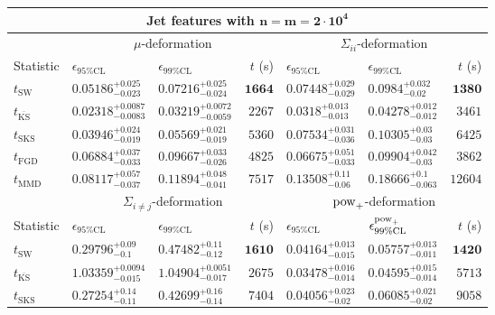 \begin{tabular}{l|llr|llr}
	\toprule
	\multicolumn{7}{c}{{\bf Jet features with $\mathbf{n=m=2\cdot 10^{4}}$}} \\
	\toprule
	\multicolumn{1}{c}{} & \multicolumn{3}{c}{$\mu$-deformation} & \multicolumn{3}{c}{$\Sigma_{ii}$-deformation} \\
	Statistic & $\epsilon_{95\%\mathrm{CL}}$ & $\epsilon_{99\%\mathrm    {CL}}$ & $t$ (s) & $\epsilon_{95\%\mathrm{CL}}$ & $\epsilon_{99\%\mathrm{CL}}$ & $t$ (s) \\
	\midrule
	$t_{\mathrm{SW}}$ & $0.05186_{-0.023}^{+0.025}$ & $0.07216_{-0.024}^{+0.025}$ & ${\mathbf{1664}}$ & $0.07448_{-0.029}^{+0.029}$ & $0.0984_{-0.02}^{+0.032}$ & ${\mathbf{1380}}$ \\
	$t_{\overline{\mathrm{KS}}}$ & ${\mathbf{0.02318_{-0.0083}^{+0.0087}}}$ & ${\mathbf{0.03219_{-0.0059}^{+0.0072}}}$ & $2267$ & ${\mathbf{0.0318_{-0.013}^{+0.013}}}$ & ${\mathbf{0.04278_{-0.012}^{+0.012}}}$ & $3461$ \\
	$t_{\mathrm{SKS}}$ & $0.03946_{-0.019}^{+0.024}$ & $0.05569_{-0.019}^{+0.021}$ & $5360$ & $0.07534_{-0.036}^{+0.031}$ & $0.10305_{-0.03}^{+0.03}$ & $6425$ \\
	$t_{\mathrm{FGD}}$ & $0.06884_{-0.033}^{+0.037}$ & $0.09667_{-0.026}^{+0.033}$ & $4825$ & $0.06675_{-0.033}^{+0.051}$ & $0.09904_{-0.03}^{+0.042}$ & $3862$ \\
	$t_{\mathrm{MMD}}$ & $0.08117_{-0.037}^{+0.057}$ & $0.11894_{-0.041}^{+0.048}$ & $7517$ & $0.13508_{-0.06}^{+0.11}$ & $0.18666_{-0.063}^{+0.1}$ & $12604$ \\
	\toprule
	\multicolumn{1}{c}{} & \multicolumn{3}{c}{$\Sigma_{i\neq j}$-deformation} & \multicolumn{3}{c}{$\rm{pow}_{+}$-deformation} \\
	Statistic & $\epsilon_{95\%\mathrm{CL}}$ & $\epsilon_{99\%\mathrm{CL}}$ & $t$ (s) & $\epsilon_{95\%\mathrm{CL}}$ & $\epsilon^{\rm   {pow}_{+}}_{99\%\mathrm{CL}}$ & $t$ (s) \\
	\midrule
	$t_{\mathrm{SW}}$ & $0.29796_{-0.1}^{+0.09}$ & $0.47482_{-0.12}^{+0.11}$ & ${\mathbf{1610}}$ & $0.04164_{-0.015}^{+0.013}$ & $0.05757_{-0.011}^{+0.013}$ & ${\mathbf{1420}}$ \\
	$t_{\overline{\mathrm{KS}}}$ & $1.03359_{-0.015}^{+0.0094}$ & $1.04904_{-0.017}^{+0.0051}$ & $2675$ & $0.03478_{-0.014}^{+0.016}$ & ${\mathbf{0.04595_{-0.014}^{+0.015}}}$ & $5713$ \\
	$t_{\mathrm{SKS}}$ & $0.27254_{-0.11}^{+0.14}$ & $0.42699_{-0.14}^{+0.16}$ & $7404$ & $0.04056_{-0.02}^{+0.023}$ & $0.06085_{-0.02}^{+0.021}$ & $9058$ \\

\end{tabular}

